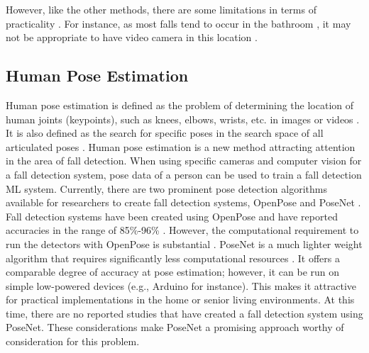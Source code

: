 However, like the other methods, there are some limitations in terms of practicality \cite{RN1018}. For instance, as most falls tend to occur in the bathroom \cite{AG2015}, it may not be appropriate to have video camera in this location \cite{RN1018}.


\subsection{Human Pose Estimation}
Human pose estimation is defined as the problem of determining the location of human joints (keypoints), such as knees, elbows, wrists, etc. in images or videos \cite{RN1003, RN1004}. It is also defined as the search for specific poses in the search space of all articulated poses \cite{RN1003, RN1004}. Human pose estimation is a new method attracting attention in the area of fall detection. When using specific cameras and computer vision for a fall detection system, pose data of a person can be used to train a fall detection ML system. Currently, there are two prominent pose detection algorithms available for researchers to create fall detection systems, OpenPose \cite{RN1003} and PoseNet \cite{posenet2019}. Fall detection systems have been created using OpenPose and have reported accuracies in the range of 85\%-96\% \cite{RN1020}. However, the computational requirement to run the detectors with OpenPose is substantial \cite{RN1003}. PoseNet is a much lighter weight algorithm that requires significantly less computational resources \cite{posenet2019}. It offers a comparable degree of accuracy at pose estimation; however, it can be run on simple low-powered devices (e.g., Arduino for instance).  This makes it attractive for practical implementations in the home or senior living environments.  At this time, there are no reported studies that have created a fall detection system using PoseNet. These considerations make PoseNet a promising approach worthy of consideration for this problem.